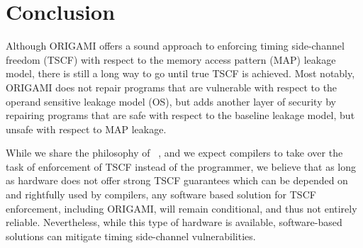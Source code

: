 


\section{Conclusion}
\label{sec:Conclusion}
Although ORIGAMI offers a sound approach to enforcing timing side-channel freedom (TSCF) with respect to the memory access pattern (MAP) leakage model, there is still a long way to go until true TSCF is achieved. Most notably, ORIGAMI does not repair programs that are vulnerable with respect to the operand sensitive leakage model (OS), but adds another layer of security by repairing programs that are safe with respect to the baseline leakage model, but unsafe with respect to MAP leakage. 

While we share the philosophy of ~\cite{WhatYouCisWhatYouGet}, and we expect compilers to take over the task of enforcement of TSCF instead of the programmer, we believe that as long as hardware does not offer strong TSCF guarantees which can be depended on and rightfully used by compilers, any software based solution for TSCF enforcement, including ORIGAMI, will remain conditional, and thus not entirely reliable. Nevertheless, while this type of hardware is available, software-based solutions can mitigate timing side-channel vulnerabilities.
